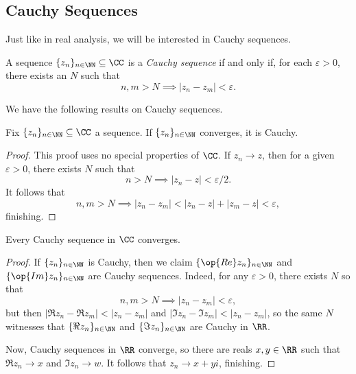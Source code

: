 \documentclass[../notes.tex]{subfiles}
\begin{document}
\subsection{Cauchy Sequences}
Just like in real analysis, we will be interested in Cauchy sequences.
\begin{definition}
	A sequence $\{z_n\}_{n\in\NN}\subseteq\CC$ is a \textit{Cauchy sequence} if and only if, for each $\varepsilon>0$, there exists an $N$ such that
	\[n,m>N\implies|z_n-z_m|<\varepsilon.\]
\end{definition}
We have the following results on Cauchy sequences.
\begin{proposition}
	Fix $\{z_n\}_{n\in\NN}\subseteq\CC$ a sequence. If $\{z_n\}_{n\in\NN}$ converges, it is Cauchy.
\end{proposition}
\begin{proof}
	This proof uses no special properties of $\CC$. If $z_n\to z$, then for a given $\varepsilon>0$, there exists $N$ such that
	\[n>N\implies|z_n-z|<\varepsilon/2.\]
	It follows that
	\[n,m>N\implies|z_n-z_m|<|z_n-z|+|z_m-z|<\varepsilon,\]
	finishing.
\end{proof}
\begin{proposition}
	Every Cauchy sequence in $\CC$ converges.
\end{proposition}
\begin{proof}
	If $\{z_n\}_{n\in\NN}$ is Cauchy, then we claim $\{\op{Re}z_n\}_{n\in\NN}$ and $\{\op{Im}z_n\}_{n\in\NN}$ are Cauchy sequences. Indeed, for any $\varepsilon>0$, there exists $N$ so that
	\[n,m>N\implies|z_n-z_m|<\varepsilon,\]
	but then $|\Re z_n-\Re z_m|<|z_n-z_m|$ and $|\Im z_n-\Im z_m|<|z_n-z_m|$, so the same $N$ witnesses that $\{\Re z_n\}_{n\in\NN}$ and $\{\Im z_n\}_{n\in\NN}$ are Cauchy in $\RR$.

	Now, Cauchy sequences in $\RR$ converge, so there are reals $x,y\in\RR$ such that $\Re z_n\to x$ and $\Im z_n\to w$. It follows that $z_n\to x+yi$, finishing.
\end{proof}
\end{document}
